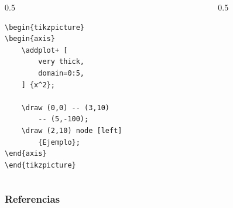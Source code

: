 \documentclass[12pt,aspectratio=169,ignorenonframetext]{ltxbeamer}
\begin{document}
\begin{frame}[fragile]
\bigskip

\begin{columns}
    \begin{column}{0.5\textwidth}
        \begin{verbatim}
\begin{tikzpicture}
\begin{axis}
    \addplot+ [
        very thick,
        domain=0:5,
    ] {x^2};

    \draw (0,0) -- (3,10)
        -- (5,-100);
    \draw (2,10) node [left]
        {Ejemplo};
\end{axis}
\end{tikzpicture}
        \end{verbatim}
    \end{column}
    {\color{gray} \vline}
    \begin{column}{0.5\textwidth}
        \lmr
    \end{column}
\end{columns}
\end{frame}





\begin{frame}[allowframebreaks]
\frametitle{Referencias}
\nocite{*}
\printbibliography
\end{frame}
\end{document}
